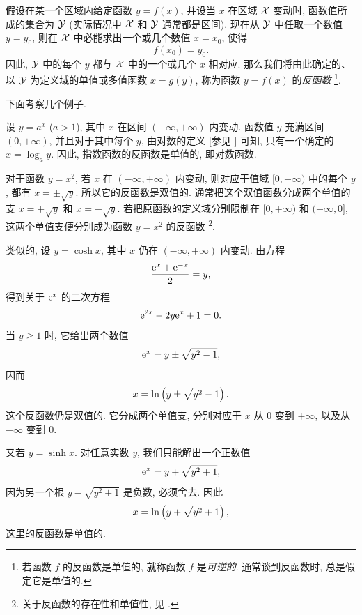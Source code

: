 假设在某一个区域内给定函数 $y=f(x)$, 并设当 $x$ 在区域 $\mathcal{X}$ 变动时,
函数值所成的集合为 $\mathcal{Y}$ (实际情况中 $\mathcal{X}$ 和 $\mathcal{Y}$ 通常都是区间).
现在从 $\mathcal{Y}$ 中任取一个数值 $y=y_0$,
则在 $\mathcal{X}$ 中必能求出一个或几个数值 $x=x_0$, 使得
$$
f(x_0)=y_0.
$$
因此, $\mathcal{Y}$ 中的每个 $y$ 都与 $\mathcal{X}$ 中的一个或几个 $x$ 相对应.
那么我们将由此确定的、以 $\mathcal{Y}$ 为定义域的单值或多值函数 $x=g(y)$,
称为函数 $y=f(x)$ 的\emph{反函数}
\footnote{若函数 $f$ 的反函数是单值的, 就称函数 $f$ 是\emph{可逆的}.
通常谈到反函数时, 总是假定它是单值的.}.

下面考察几个例子.

\label{ex:inverse_exponential_function}
设 $y=a^x$ ($a>1$), 其中 $x$ 在区间 $(-\infty,+\infty)$ 内变动.
函数值 $y$ 充满区间 $(0,+\infty)$, 并且对于其中每个 $y$,
由对数的定义 [参见 ] 可知, 只有一个确定的 $x=\log_a y$.
因此, 指数函数的反函数是单值的, 即对数函数.

\label{ex:inverse_square_function}
对于函数 $y=x^2$, 若 $x$ 在 $(-\infty,+\infty)$ 内变动,
则对应于值域 $[0,+\infty)$ 中的每个 $y$, 都有 $x=\pm\sqrt{y}$.
所以它的反函数是双值的. 通常把这个双值函数分成两个单值的支
$x=+\sqrt{y}$ 和 $x=-\sqrt{y}$.
若把原函数的定义域分别限制在 $[0,+\infty)$ 和 $(-\infty,0]$,
这两个单值支便分别成为函数 $y=x^2$ 的反函数
\footnote{关于反函数的存在性和单值性, 见 .}.

\label{ex:inverse_hyperbolic_cosine}
类似的, 设 $y=\cosh x$, 其中 $x$ 仍在 $(-\infty,+\infty)$ 内变动.
由方程
$$
\frac{\mathrm{e}^x+\mathrm{e}^{-x}}{2}=y,
$$
得到关于 $\mathrm{e}^x$ 的二次方程
$$
\mathrm{e}^{2x}-2y\mathrm{e}^x+1=0.
$$
当 $y\geqslant1$ 时, 它给出两个数值
$$
\mathrm{e}^x=y\pm\sqrt{y^2-1},
$$
因而
$$
x=\ln\left( y\pm\sqrt{y^2-1} \right).
$$
这个反函数仍是双值的. 它分成两个单值支,
分别对应于 $x$ 从 $0$ 变到 $+\infty$, 以及从 $-\infty$ 变到 $0$.

\label{ex:inverse_hyperbolic_sine}
又若 $y=\sinh x$. 对任意实数 $y$, 我们只能解出一个正数值
$$
\mathrm{e}^x=y+\sqrt{y^2+1},
$$
因为另一个根 $y-\sqrt{y^2+1}$ 是负数, 必须舍去.
因此
$$
x=\ln\left( y+\sqrt{y^2+1} \right),
$$
这里的反函数是单值的.

